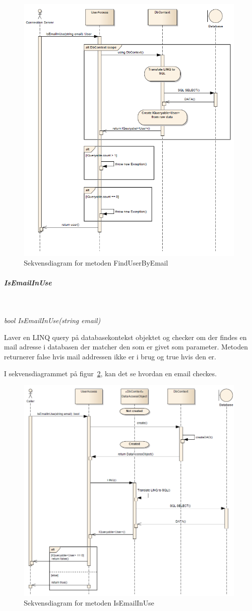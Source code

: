 \begin{figure}
\centering
\includegraphics[width=0.7\linewidth]{figs/dbSeq/findUserByEmail.PNG}
\caption{Sekvensdiagram for metoden FindUserByEmail}
\label{fig:findUserByEmail}
\end{figure}


\subparagraph{IsEmailInUse}\

\textit{bool IsEmailInUse(string email)}

Laver en LINQ query på databasekontekst objektet og checker om der findes en mail adresse i databasen der matcher den som er givet som parameter. Metoden returnerer false hvis mail addressen ikke er i brug og true hvis den er.

I sekvensdiagrammet på figur~\ref{fig:isEmailInUse}, kan det se hvordan en email checkes.

\begin{figure}
\centering
\includegraphics[width=0.7\linewidth]{figs/dbSeq/isEmailInUse.PNG}
\caption{Sekvensdiagram for metoden IsEmailInUse}
\label{fig:isEmailInUse}
\end{figure}


